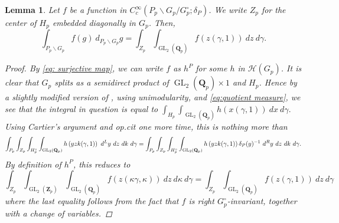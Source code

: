 \documentclass{amsart}%
\theoremstyle{plain}
\newtheorem{lem}[thm]{Lemma}
\newcommand\scalemath[2]{\scalebox{#1}{\mbox{\ensuremath{\displaystyle #2}}}}
\theoremstyle{plain}
\theoremstyle{remark}
\DeclareMathOperator{\GL}{GL}
\begin{document}
\begin{lem}\label{lem unfolding}
    Let $f$ be a function in $C_c^\infty(P_p\backslash G_p/G_p^\circ;\delta_P)$. We write $Z_p$ for the center of $H_p$ embedded diagonally in $G_p$. Then,
    $$\int_{P_p\backslash G_p} f(g)\ d_{P_p\backslash G_p}g=\int_{Z_p}\int_{\GL_2(\mathbf{Q}_p)}f(z(\gamma,1))\ dz\ d\gamma.$$
    \begin{proof}
    By \eqref{eq: surjective map}, we can write $f$ as $h^P$ for some $h$ in $\mathcal{H}(G_p)$.
        It is clear that $G_p$ splits as a semidirect product of $ \GL_2(\mathbf{Q}_p)\times 1$ and $H_p$. Hence by a slightly modified version of \cite[Lemma $2.4$]{kurinczuk2017rankin}, using unimodularity, and \eqref{eq:quotient measure}, we see that the integral in question is equal to $\int_{H_p}\int_{\GL_2(\mathbf{Q}_p)}h\left(x(\gamma,1)\right)\ dx\ d\gamma.$ Using  Cartier's argument and \textit{op.cit} one more time, this is nothing more than $$\scalemath{0.98}{\int_{P_p}\int_{Z_p}\int_{H_p^\circ}\int_{\GL_2(\mathbf{Q}_p)}h\left(yzk(\gamma,1)\right)\ d^Ly\ dz\ dk\ d\gamma=\int_{P_p}\int_{Z_p}\int_{H_p^\circ}\int_{\GL_2(\mathbf{Q}_p)}h\left(yzk(\gamma,1)\right)\delta_P(y)^{-1}\ d^Ry\ dz\ dk\ d\gamma}.$$
        By definition of $h^P$, this reduces to
        $$\int_{Z_p}\int_{\GL_2(\mathbf{Z}_p)}\int_{\GL_2(\mathbf{Q}_p)}f(z(\kappa\gamma,\kappa))\ dz\ d\kappa\ d\gamma=\int_{Z_p}\int_{\GL_2(\mathbf{Q}_p)}f(z(\gamma,1))\ dz\ d\gamma$$
        where the last equality follows from the fact that $f$ is right $G_p^\circ$-invariant, together with a change of variables.
    \end{proof}
\end{lem}
\end{document}

